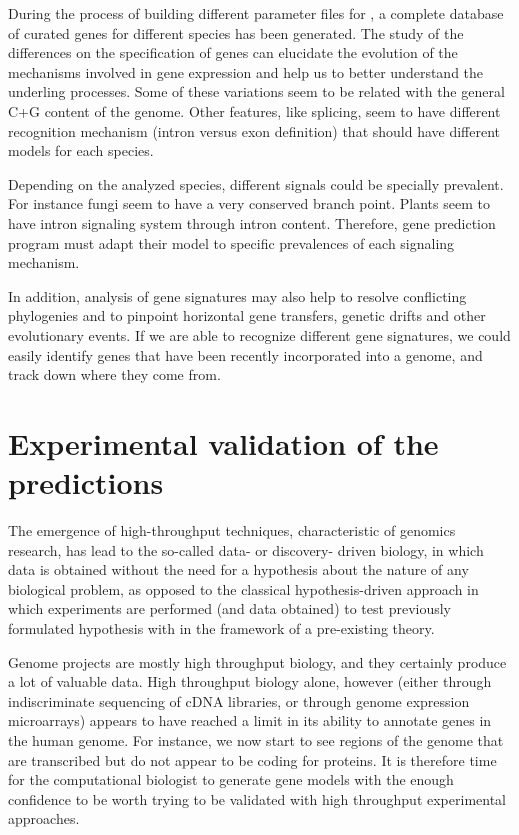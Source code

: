 During the process of building different parameter files for \geneid,
a complete database of curated genes for different species has been
generated. The study of the differences on the specification of genes
can elucidate the evolution of the mechanisms involved in gene
expression and help us to better understand the underling
processes. Some of these variations seem to be related with the
general C+G content of the genome. Other features, like splicing, seem
to have different recognition mechanism (intron versus exon
definition) that should have different models for each species.

Depending on the analyzed species, different signals could be
specially prevalent. For instance fungi seem to have a very conserved
branch point. Plants seem to have intron signaling system through
intron content.  Therefore, gene prediction program must adapt their
model to specific prevalences of each signaling mechanism.


In addition, analysis of gene signatures may also help to resolve
conflicting phylogenies and to pinpoint horizontal gene transfers,
genetic drifts and other evolutionary events. If we are able to
recognize different gene signatures, we could easily identify genes
that have been recently incorporated into a genome, and track down
where they come from.





\section{Experimental validation of the predictions}

The emergence of high-throughput techniques, characteristic of
genomics research, has lead to the so-called data- or discovery-
driven biology, in which data is obtained without the need for a
hypothesis about the nature of any biological problem, as opposed to
the classical hypothesis-driven approach in which experiments are
performed (and data obtained) to test previously formulated hypothesis
with in the framework of a pre-existing theory.

Genome projects are mostly high throughput biology, and they certainly
produce a lot of valuable data. High throughput biology alone, however
(either through indiscriminate sequencing of cDNA libraries, or
through genome expression microarrays) appears to have reached a limit
in its ability to annotate genes in the human genome. For instance, we
now start to see regions of the genome that are transcribed but do not
appear to be coding for proteins. It is therefore time for the
computational biologist to generate gene models with the enough
confidence to be worth trying to be validated with high throughput
experimental approaches.

